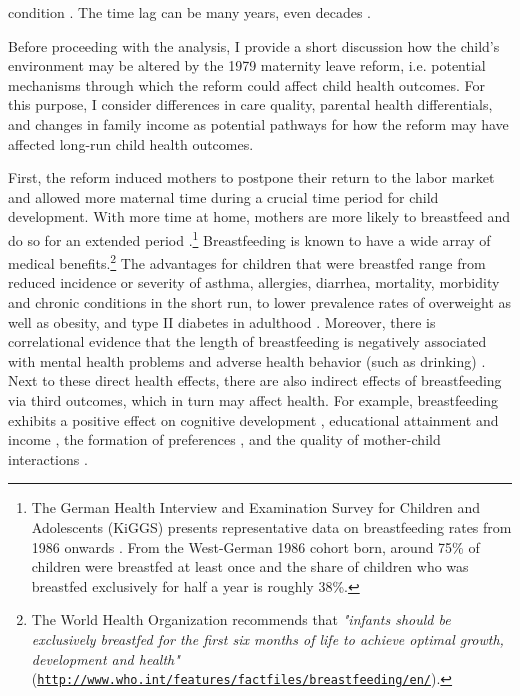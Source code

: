 \documentclass[11pt, a4paper]{article} %
\begin{document}
condition \citep{almond2011fetalorigins}. The time lag can be many years, even decades \citep{shonkoff2009neuroscience}.\newline


Before proceeding with the analysis, I provide a short discussion how the child's environment may be altered by the 1979 maternity leave reform, i.e. potential mechanisms through which the reform could affect child health outcomes. For this purpose, I consider differences in care quality, parental health differentials, and changes in family income as potential pathways for how the reform may have affected long-run child health outcomes. \newline %

First, the reform induced mothers to postpone their return to the labor market and allowed more maternal time during a crucial time period for child development. With more time at home, mothers are more likely to breastfeed and do so for an extended period \citep{baker2008maternal,berger2005earlymaternal}.\footnote{The German Health Interview and Examination Survey for Children and Adolescents (KiGGS) presents representative data on breastfeeding rates from 1986 onwards \citep{lange2007breastfeeding}. From the West-German 1986 cohort born, around 75\% of children were breastfed at least once and the share of children who was breastfed exclusively for half a year is roughly 38\%.} Breastfeeding is known to have a wide array of medical benefits.\footnote{The World Health Organization recommends that \textit{"infants should be exclusively breastfed for the first six months of life to achieve optimal growth, development and health"} (\href{http://www.who.int/features/factfiles/breastfeeding/en/}{\nolinkurl{http://www.who.int/features/factfiles/breastfeeding/en/}}).} The advantages for children that were breastfed range from reduced incidence or severity of asthma, allergies, diarrhea, mortality, morbidity and chronic conditions in the short run, to lower prevalence rates of overweight as well as obesity, and type II diabetes in adulthood \citep{ruhm2000parental, victora2016breastfeeding}. Moreover, there is correlational evidence that the length of breastfeeding is negatively associated with mental health problems and adverse health behavior (such as drinking) \citep{oddy2010longterm,falk2016early}. Next to these direct health effects, there are also indirect effects of breastfeeding via third outcomes, which in turn may affect health. For example, breastfeeding exhibits a positive effect on cognitive development \citep{albagli2018}, educational attainment and income \citep{victoria2015association}, the formation of preferences \citep{falk2016early}, and the quality of mother-child interactions \citep{papp2014longitudinal}. \newline 
\end{document}
